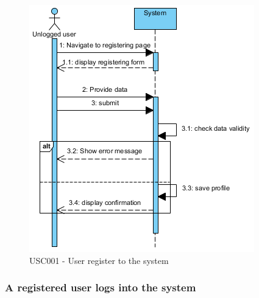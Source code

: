 \documentclass[10pt,a4paper,titlepage]{article}
\begin{document}
\begin{figure}[h]
\centering
\includegraphics[width=\linewidth]{./Sequence_diag/USC001.png}
\caption[USC001]{USC001 - User register to the system}
\label{fig:USC001}
\end{figure}

\clearpage
\subsubsection{A registered user logs into the system}
\end{document}

